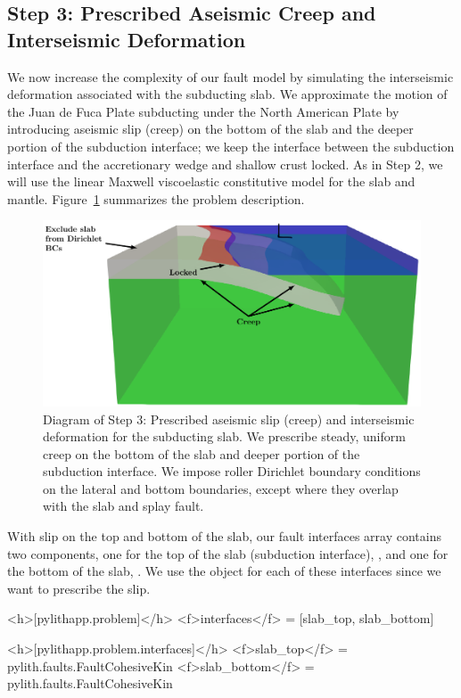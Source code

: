 \subsection{Step 3: Prescribed Aseismic Creep and Interseismic Deformation}
\label{sec:example:subduction:3d:step03}

We now increase the complexity of our fault model by simulating the
interseismic deformation associated with the subducting slab. We
approximate the motion of the Juan de Fuca Plate subducting under the
North American Plate by introducing aseismic slip (creep) on the
bottom of the slab and the deeper portion of the subduction interface;
we keep the interface between the subduction interface and the
accretionary wedge and shallow crust locked. As in Step 2, we will use
the linear Maxwell viscoelastic constitutive model for the slab and
mantle.  Figure~\ref{fig:example:subduction:3d:step03:diagram}
summarizes the problem description.

\begin{figure}[htbp]
  \includegraphics[width=5.0in]{examples/figs/subduction3d_step03_diagram}
  \caption{Diagram of Step 3: Prescribed aseismic slip (creep) and
    interseismic deformation for the subducting slab. We prescribe
    steady, uniform creep on the bottom of the slab and deeper portion
    of the subduction interface. We impose roller Dirichlet boundary
    conditions on the lateral and bottom boundaries, except where they
    overlap with the slab and splay fault.}
  \label{fig:example:subduction:3d:step03:diagram}
\end{figure}

With slip on the top and bottom of the slab, our fault interfaces
array contains two components, one for the top of the slab (subduction
interface), , and one for the bottom of the slab,
. We use the  object
for each of these interfaces since we want to prescribe the slip.
\begin{cfg}
<h>[pylithapp.problem]</h>
<f>interfaces</f> = [slab_top, slab_bottom]

<h>[pylithapp.problem.interfaces]</h>
<f>slab_top</f> = pylith.faults.FaultCohesiveKin
<f>slab_bottom</f> = pylith.faults.FaultCohesiveKin
\end{cfg}

